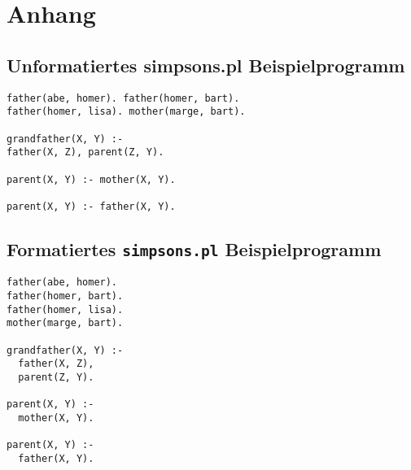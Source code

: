 \documentclass[parskip=full,11pt,twoside]{scrartcl}
\begin{document}
\newpage
\section{Anhang}

\subsection{Unformatiertes simpsons.pl Beispielprogramm}

\begin{lstlisting}
father(abe, homer). father(homer, bart).
father(homer, lisa). mother(marge, bart).

grandfather(X, Y) :-
father(X, Z), parent(Z, Y).

parent(X, Y) :- mother(X, Y).

parent(X, Y) :- father(X, Y).
\end{lstlisting}

\subsection{Formatiertes \texttt{simpsons.pl} Beispielprogramm}

\begin{lstlisting}
father(abe, homer).
father(homer, bart).
father(homer, lisa).
mother(marge, bart).

grandfather(X, Y) :-
  father(X, Z),
  parent(Z, Y).

parent(X, Y) :-
  mother(X, Y).

parent(X, Y) :-
  father(X, Y).
\end{lstlisting}
\end{document}

